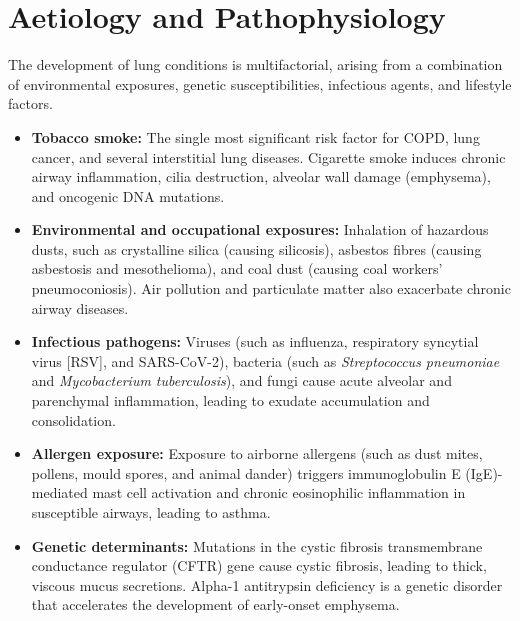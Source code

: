\section*{Aetiology and Pathophysiology}
The development of lung conditions is multifactorial, arising from a combination of environmental exposures, genetic susceptibilities, infectious agents, and lifestyle factors.
\begin{itemize}
    \item \textbf{Tobacco smoke:} The single most significant risk factor for COPD, lung cancer, and several interstitial lung diseases. Cigarette smoke induces chronic airway inflammation, cilia destruction, alveolar wall damage (emphysema), and oncogenic DNA mutations.
    \item \textbf{Environmental and occupational exposures:} Inhalation of hazardous dusts, such as crystalline silica (causing silicosis), asbestos fibres (causing asbestosis and mesothelioma), and coal dust (causing coal workers' pneumoconiosis). Air pollution and particulate matter also exacerbate chronic airway diseases.
    \item \textbf{Infectious pathogens:} Viruses (such as influenza, respiratory syncytial virus [RSV], and SARS-CoV-2), bacteria (such as \textit{Streptococcus pneumoniae} and \textit{Mycobacterium tuberculosis}), and fungi cause acute alveolar and parenchymal inflammation, leading to exudate accumulation and consolidation.
    \item \textbf{Allergen exposure:} Exposure to airborne allergens (such as dust mites, pollens, mould spores, and animal dander) triggers immunoglobulin E (IgE)-mediated mast cell activation and chronic eosinophilic inflammation in susceptible airways, leading to asthma.
    \item \textbf{Genetic determinants:} Mutations in the cystic fibrosis transmembrane conductance regulator (CFTR) gene cause cystic fibrosis, leading to thick, viscous mucus secretions. Alpha-1 antitrypsin deficiency is a genetic disorder that accelerates the development of early-onset emphysema.
\end{itemize}

